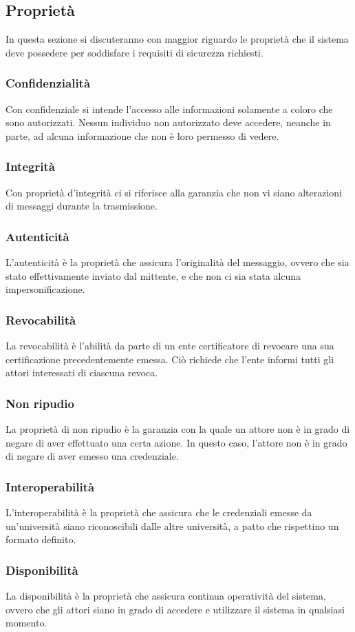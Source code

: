 \documentclass[a4paper,12pt]{article}
\begin{document}
\subsection{Proprietà}
In questa sezione si discuteranno con maggior riguardo le proprietà che il sistema deve possedere per soddisfare i requisiti di sicurezza richiesti.
\subsubsection{Confidenzialità}
Con confidenziale si intende l'accesso alle informazioni solamente a coloro che sono autorizzati. Nessun individuo non autorizzato deve accedere, neanche in parte, ad alcuna informazione che non è loro permesso di vedere.
\subsubsection{Integrità}
Con proprietà d'integrità ci si riferisce alla garanzia che non vi siano alterazioni di messaggi durante la trasmissione. 
\subsubsection{Autenticità}
L'autenticità è la proprietà che assicura l'originalità del messaggio, ovvero che sia stato effettivamente inviato dal mittente, e che non ci sia stata alcuna impersonificazione.
\subsubsection{Revocabilità}
La revocabilità è l'abilità da parte di un ente certificatore di revocare una sua certificazione precedentemente emessa. Ciò richiede che l'ente informi tutti gli attori interessati di ciascuna revoca.
\subsubsection{Non ripudio}
La proprietà di non ripudio è la garanzia con la quale un attore non è in grado di negare di aver effettuato una certa azione. In questo caso, l'attore non è in grado di negare di aver emesso una credenziale.
\subsubsection{Interoperabilità}
L'interoperabilità è la proprietà che assicura che le credenziali emesse da un'università siano riconoscibili dalle altre università, a patto che rispettino un formato definito.
\subsubsection{Disponibilità}
La disponibilità è la proprietà che assicura continua operatività del sistema, ovvero che gli attori siano in grado di accedere e utilizzare il sistema in qualsiasi momento.
\end{document}
